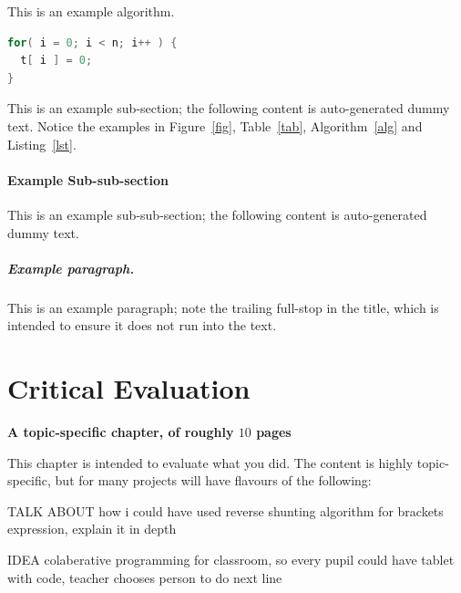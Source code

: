 \documentclass[ %
                    author={Jonathan Rankin},
                supervisor={Dr. David May, Dr. Ian Holyer},
                    degree={MEng},
                     title={CodeTouch},
                  subtitle={A Revolutionary Way To Program Real Code On Touch Screen Devices},
                      type={enterprise},
                      year={2015 } ]{dissertation}
\begin{document}
\begin{algorithm}[t]
\caption{This is an example algorithm.}
\label{alg}
\end{algorithm}

\begin{lstlisting}[float={t},caption={This is an example listing.},label={lst},language=C]
for( i = 0; i < n; i++ ) {
  t[ i ] = 0;
}
\end{lstlisting}

This is an example sub-section;
the following content is auto-generated dummy text.
Notice the examples in Figure~\ref{fig}, Table~\ref{tab}, Algorithm~\ref{alg}
and Listing~\ref{lst}.
\lipsum

\subsubsection{Example Sub-sub-section}

This is an example sub-sub-section;
the following content is auto-generated dummy text.
\lipsum

\paragraph{Example paragraph.}

This is an example paragraph; note the trailing full-stop in the title,
which is intended to ensure it does not run into the text.


\chapter{Critical Evaluation}
\label{chap:evaluation}

{\bf A topic-specific chapter, of roughly $10$ pages} 
\vspace{1cm} 

\noindent
This chapter is intended to evaluate what you did.  The content is highly 
topic-specific, but for many projects will have flavours of the following:

TALK ABOUT how i could have used reverse shunting algorithm for brackets expression, explain it in depth

IDEA colaberative programming for classroom, so every pupil could have tablet with code, teacher chooses person to do next line
\end{document}
